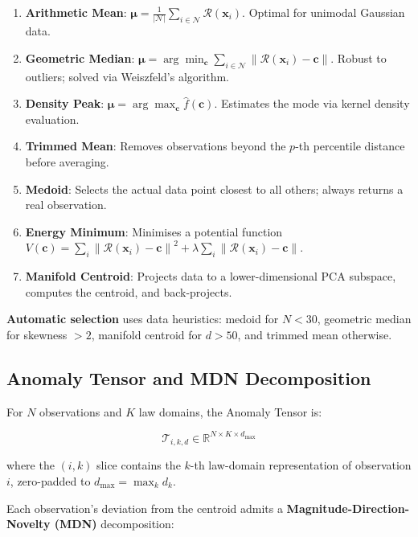 \documentclass[journal]{IEEEtran}
\newcommand{\R}{\mathbb{R}}
\newcommand{\N}{\mathcal{N}}
\newcommand{\T}{\mathcal{T}}
\newcommand{\calR}{\mathcal{R}}
\newcommand{\norm}[1]{\left\lVert#1\right\rVert}
\begin{document}
\begin{enumerate}
  \item \textbf{Arithmetic Mean}: $\boldsymbol{\mu} = \frac{1}{|\N|}\sum_{i \in \N} \calR(\mathbf{x}_i)$. Optimal for unimodal Gaussian data.
  \item \textbf{Geometric Median}: $\boldsymbol{\mu} = \arg\min_{\boldsymbol{c}} \sum_{i \in \N} \norm{\calR(\mathbf{x}_i) - \boldsymbol{c}}$. Robust to outliers; solved via Weiszfeld's algorithm.
  \item \textbf{Density Peak}: $\boldsymbol{\mu} = \arg\max_{\boldsymbol{c}} \hat{f}(\boldsymbol{c})$. Estimates the mode via kernel density evaluation.
  \item \textbf{Trimmed Mean}: Removes observations beyond the $p$-th percentile distance before averaging.
  \item \textbf{Medoid}: Selects the actual data point closest to all others; always returns a real observation.
  \item \textbf{Energy Minimum}: Minimises a potential function $V(\boldsymbol{c}) = \sum_i \norm{\calR(\mathbf{x}_i) - \boldsymbol{c}}^2 + \lambda\sum_i \norm{\calR(\mathbf{x}_i) - \boldsymbol{c}}$.
  \item \textbf{Manifold Centroid}: Projects data to a lower-dimensional PCA subspace, computes the centroid, and back-projects.
\end{enumerate}

\textbf{Automatic selection} uses data heuristics: medoid for $N < 30$, geometric median for skewness $> 2$, manifold centroid for $d > 50$, and trimmed mean otherwise.

\subsection{Anomaly Tensor and MDN Decomposition}
\label{ssec:tensor}

For $N$ observations and $K$ law domains, the Anomaly Tensor is:

\begin{equation}
\T_{i,k,d} \in \R^{N \times K \times d_{\max}}
\label{eq:tensor}
\end{equation}

where the $(i,k)$ slice contains the $k$-th law-domain representation of observation $i$, zero-padded to $d_{\max} = \max_k d_k$.

Each observation's deviation from the centroid admits a \textbf{Magnitude-Direction-Novelty (MDN)} decomposition:
\end{document}
